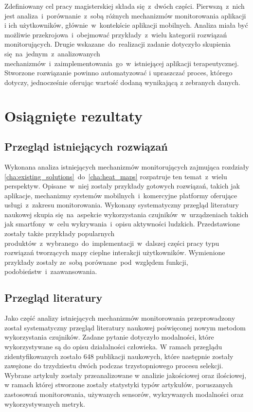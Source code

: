 Zdefiniowany cel pracy magisterskiej składa się~z~dwóch części. Pierwszą~z~nich jest analiza~i~porównanie~z~sobą różnych mechanizmów monitorowania aplikacji i ich użytkowników, głównie~w~kontekście aplikacji mobilnych. Analiza miała być możliwie przekrojowa~i~obejmować przykłady~z~wielu kategorii rozwiązań monitorujących. Drugie wskazane~do~realizacji zadanie dotyczyło skupienia się~na~jednym~z~analizowanych mechanizmów~i~zaimplementowania~go~w~istniejącej aplikacji terapeutycznej. Stworzone rozwiązanie powinno automatyzować i upraszczać proces, którego dotyczy, jednocześnie oferując wartość dodaną wynikającą z zebranych danych.
	
\section{Osiągnięte rezultaty}

\subsection{Przegląd istniejących rozwiązań}
Wykonana analiza istniejących mechanizmów monitorujących zajmująca rozdziały \ref{cha:existing_solutions}~do~\ref{cha:heat_maps} rozpatruje ten temat~z~wielu perspektyw. Opisane~w~niej zostały przykłady gotowych rozwiązań, takich jak aplikacje, mechanizmy systemów mobilnych~i~komercyjne platformy oferujące usługi~z~zakresu monitorowania. Wykonany systematyczny przegląd literatury naukowej skupia się~na~aspekcie wykorzystania czujników~w~urządzeniach takich jak smartfony~w~celu wykrywania~i~opisu aktywności ludzkich. Przedstawione zostały także przykłady popularnych produktów~z~wybranego~do~implementacji~w~dalszej części pracy typu rozwiązań tworzących mapy cieplne interakcji użytkowników. Wymienione przykłady zostały ze~sobą porównane~pod~względem funkcji, podobieństw~i~zaawansowania.

\subsection{Przegląd literatury}
Jako część analizy istniejących mechanizmów monitorowania przeprowadzony został systematyczny przegląd literatury naukowej poświęconej nowym metodom wykorzystania czujników. Zadane pytanie dotyczyło modalności, które wykorzystywane są do opisu działalności człowieka. W ramach przeglądu zidentyfikowanych zostało 648 publikacji naukowych, które następnie zostały zawężone do trzydziestu dwóch podczas trzystopniowego procesu selekcji. Wybrane artykuły zostały przeanalizowane w analizie jakościowej oraz ilościowej, w ramach której stworzone zostały statystyki typów artykułów, poruszanych zastosowań monitorowania, używanych sensorów, wykrywanych modalności oraz wykorzystywanych metryk.

